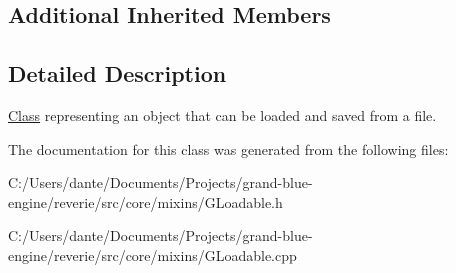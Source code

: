 \subsection*{Additional Inherited Members}


\subsection{Detailed Description}
\mbox{\hyperlink{struct_class}{Class}} representing an object that can be loaded and saved from a file. 

The documentation for this class was generated from the following files\+:\begin{DoxyCompactItemize}
\item 
C\+:/\+Users/dante/\+Documents/\+Projects/grand-\/blue-\/engine/reverie/src/core/mixins/G\+Loadable.\+h\item 
C\+:/\+Users/dante/\+Documents/\+Projects/grand-\/blue-\/engine/reverie/src/core/mixins/G\+Loadable.\+cpp\end{DoxyCompactItemize}
